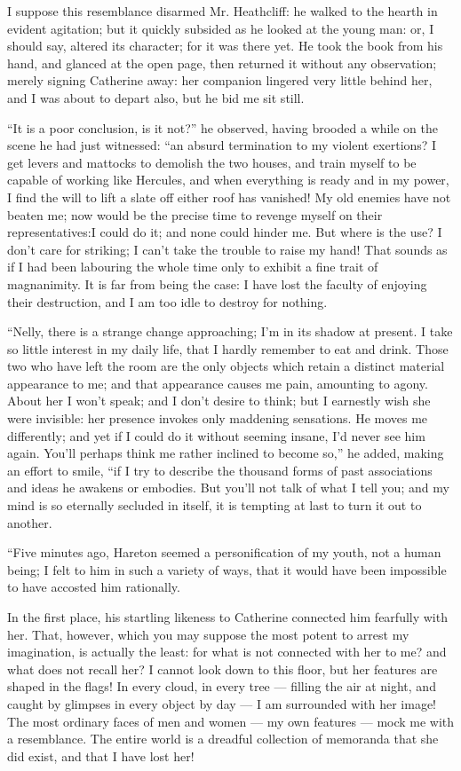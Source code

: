 \par I suppose this resemblance disarmed Mr. Heathcliff: he walked to the hearth in evident agitation; but it quickly subsided as he looked at the young man: or, I should say, altered its character; for it was there yet. He took the book from his hand, and glanced at the open page, then returned it without any observation; merely signing Catherine away: her companion lingered very little behind her, and I was about to depart also, but he bid me sit still.
\par “It is a poor conclusion, is it not?” he observed, having brooded a while on the scene he had just witnessed: “an absurd termination to my violent exertions? I get levers and mattocks to demolish the two houses, and train myself to be capable of working like Hercules, and when everything is ready and in my power, I find the will to lift a slate off either roof has vanished! My old enemies have not beaten me; now would be the precise time to revenge myself on their representatives:I could do it; and none could hinder me. But where is the use? I don't care for striking; I can't take the trouble to raise my hand! That sounds as if I had been labouring the whole time only to exhibit a fine trait of magnanimity. It is far from being the case: I have lost the faculty of enjoying their destruction, and I am too idle to destroy for nothing.
\par “Nelly, there is a strange change approaching; I'm in its shadow at present. I take so little interest in my daily life, that I hardly remember to eat and drink. Those two who have left the room are the only objects which retain a distinct material appearance to me; and that appearance causes me pain, amounting to agony. About her I won't speak; and I don't desire to think; but I earnestly wish she were invisible: her presence invokes only maddening sensations. He moves me differently; and yet if I could do it without seeming insane, I'd never see him again. You'll perhaps think me rather inclined to become so,” he added, making an effort to smile, “if I try to describe the thousand forms of past associations and ideas he awakens or embodies. But you'll not talk of what I tell you; and my mind is so eternally secluded in itself, it is tempting at last to turn it out to another.
\par “Five minutes ago, Hareton seemed a personification of my youth, not a human being; I felt to him in such a variety of ways, that it would have been impossible to have accosted him rationally.
\par In the first place, his startling likeness to Catherine connected him fearfully with her. That, however, which you may suppose the most potent to arrest my imagination, is actually the least: for what is not connected with her to me? and what does not recall her? I cannot look down to this floor, but her features are shaped in the flags! In every cloud, in every tree — filling the air at night, and caught by glimpses in every object by day — I am surrounded with her image! The most ordinary faces of men and women — my own features — mock me with a resemblance. The entire world is a dreadful collection of memoranda that she did exist, and that I have lost her!
